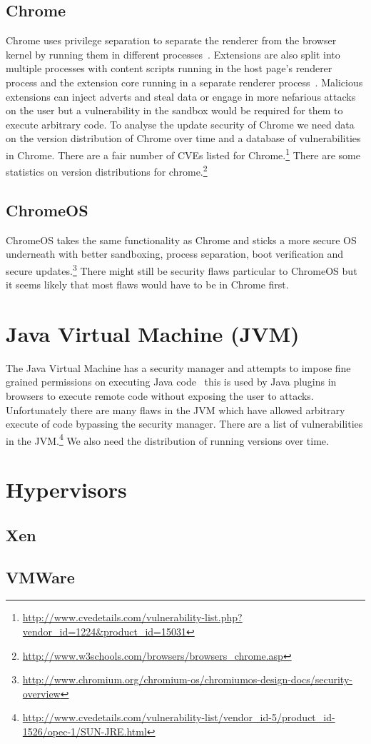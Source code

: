 \documentclass[12pt,a4paper]{article}
\begin{document}
\subsection{Chrome}
Chrome uses privilege separation to separate the renderer from the browser kernel by running them in different processes~\cite{Barth2008}.
Extensions are also split into multiple processes with content scripts running in the host page's renderer process and the extension core running in a separate renderer process~\cite{Liu2012}.
Malicious extensions can inject adverts and steal data or engage in more nefarious attacks on the user but a vulnerability in the sandbox would be required for them to execute arbitrary code.
To analyse the update security of Chrome we need data on the version distribution of Chrome over time and a database of vulnerabilities in Chrome.
There are a fair number of CVEs listed for Chrome.\footnote{\url{http://www.cvedetails.com/vulnerability-list.php?vendor_id=1224&product_id=15031}}
There are some statistics on version distributions for chrome.\footnote{\url{http://www.w3schools.com/browsers/browsers_chrome.asp}}

\subsection{ChromeOS}
ChromeOS takes the same functionality as Chrome and sticks a more secure OS underneath with better sandboxing, process separation, boot verification and secure updates.\footnote{\url{http://www.chromium.org/chromium-os/chromiumos-design-docs/security-overview}}
There might still be security flaws particular to ChromeOS but it seems likely that most flaws would have to be in Chrome first.

\section{Java Virtual Machine (JVM)}
The Java Virtual Machine has a security manager and attempts to impose fine grained permissions on executing Java code~\cite{Gong1997} this is used by Java plugins in browsers to execute remote code without exposing the user to attacks.
Unfortunately there are many flaws in the JVM which have allowed arbitrary execute of code bypassing the security manager.
There are a list of vulnerabilities in the JVM.\footnote{\url{http://www.cvedetails.com/vulnerability-list/vendor_id-5/product_id-1526/opec-1/SUN-JRE.html}}
We also need the distribution of running versions over time.

\section{Hypervisors}
\subsection{Xen}
\subsection{VMWare}

\printbibliography
\end{document}
